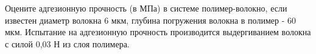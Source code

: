 
Оцените адгезионную прочность (в МПа) в системе полимер-волокно, если известен диаметр волокна 6 мкм, глубина погружения волокна в полимер - 60 мкм. Испытание на адгезионную прочность производится выдергиванием волокна с силой 0,03 Н из слоя полимера.